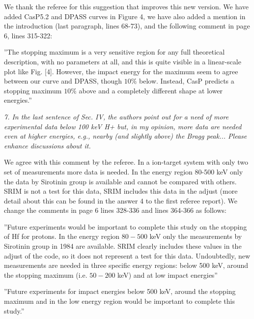 \documentclass[a4paper,10pt]{article}
\begin{document}
\vspace{0.1cm}
{\color{red} We thank the referee for this suggestion that improves this new version.  We have added CasP5.2 and DPASS curves in Figure 4, we have also added a mention in the introduction (last paragraph, lines 68-73), and the following comment in page 6, lines 315-322:}

{\small ''The stopping maximum is a very sensitive region for any full theoretical description, with no parameters at all, and this is quite visible in a linear-scale plot like Fig. [4]. However, the impact energy for the maximum seem to agree between our curve and DPASS, though $10 \%$ below. Instead, CasP predicts a stopping maximum $10 \%$ above and a completely different shape at lower energies.''}



\vspace{0.25cm}
\textsl{7. In the last sentence of Sec. IV, the authors point out for a need
of more experimental data below 100 keV H+ but, in my opinion, more
data are needed even at higher energies, e.g., nearby (and slightly
above) the Bragg peak... Please enhance discussions about it.}

\vspace{0.1cm}
{\color{red} We agree with this comment by the referee. In a ion-target system with only two set of measurements more data is needed. In the energy region 80-500 keV only the data by Sirotinin group is available and cannot be compared with others. SRIM is not a test for this data, SRIM includes this data in the adjust (more detail about this can be found in the answer 4 to the first referee report). We change the comments in page 6 lines 328-336 and lines 364-366 as follows:}

{\small ''Future experiments  would be important to
complete this study on the stopping of Hf for protons. In the energy region $80-500$ keV only the measurements by Sirotinin group in 1984 are available. SRIM clearly includes these values in the adjust of the code, so it does not represent a test for this data. Undoubtedly, new measurements are needed in three specific energy regions: below 500 keV, around the stopping maximum (i.e. $50-200$ keV) and at low impact energies''} 

{\small ''Future experiments for impact energies 
below 500 keV, around the stopping maximum and in the low energy region would be important to complete this study.''}
\end{document}
